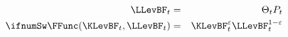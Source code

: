 \begin{eqnarray*}
    \LLevBF_{t} & = & \Theta_{t} {P}_{t}
\\ \ifnumSw \FFunc(\KLevBF_{t},\LLevBF_{t}) & = & \KLevBF_{t}^{\varepsilon}\LLevBF_{t}^{1-\varepsilon} \label{eq:defLF}
\end{eqnarray*}
